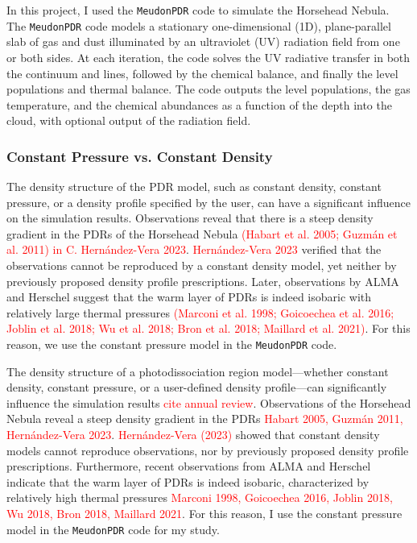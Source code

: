 \documentclass[12pt,a4paper]{article}
\newcommand{\mdpdr}{\texttt{MeudonPDR} code}
\newcommand{\qt}[1]{\textcolor{red}{#1}}
\begin{document}
In this project, I used the \mdpdr{} \parencite{LePetit_2006,Goicoechea_2007,Gonzalez_2008,LeBourlot_2012,Bron_thesis,Bron_2014,Bron_2016} to simulate the Horsehead Nebula. The \mdpdr{} models a stationary one-dimensional (1D), plane-parallel slab of gas and dust illuminated by an ultraviolet (UV) radiation field from one or both sides. At each iteration, the code solves the UV radiative transfer in both the continuum and lines, followed by the chemical balance, and finally the level populations and thermal balance. The code outputs the level populations, the gas temperature, and the chemical abundances as a function of the depth into the cloud, with optional output of the radiation field.

\subsubsection{Constant Pressure vs. Constant Density}

The density structure of the PDR model, such as constant density, constant pressure, or a density profile specified by the user, can have a significant influence on the simulation results. Observations reveal that there is a steep density gradient in the PDRs of the Horsehead Nebula \qt{(Habart et al. 2005; Guzmán et al. 2011) in C. Hernández-Vera 2023}. \qt{Hernández-Vera 2023} verified that the observations cannot be reproduced by a constant density model, yet neither by previously proposed density profile prescriptions. Later, observations by ALMA and Herschel suggest that the warm layer of PDRs is indeed isobaric with relatively large thermal pressures \qt{(Marconi et al. 1998; Goicoechea et al. 2016; Joblin et al. 2018; Wu et al. 2018; Bron et al. 2018; Maillard et al. 2021)}. For this reason, we use the constant pressure model in the \mdpdr{}.

The density structure of a photodissociation region model—whether constant density, constant pressure, or a user-defined density profile—can significantly influence the simulation results \qt{cite annual review}. Observations of the Horsehead Nebula reveal a steep density gradient in the PDRs \qt{{Habart 2005, Guzmán 2011, Hernández-Vera 2023}}. \qt{Hernández-Vera (2023)} showed that constant density models cannot reproduce observations, nor by previously proposed density profile prescriptions. Furthermore, recent observations from ALMA and Herschel indicate that the warm layer of PDRs is indeed isobaric, characterized by relatively high thermal pressures \qt{{Marconi 1998, Goicoechea 2016, Joblin 2018, Wu 2018, Bron 2018, Maillard 2021}}. For this reason, I use the constant pressure model in the \mdpdr{} for my study.
\end{document}
